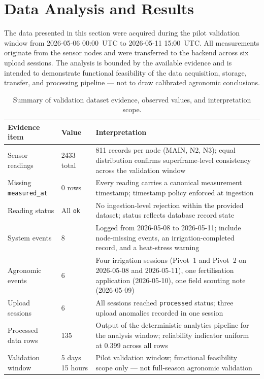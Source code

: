 \section{Data Analysis and Results}
\label{sec:results}

The data presented in this section were acquired during the pilot validation window from 2026-05-06 00:00~UTC to 2026-05-11 15:00~UTC. All measurements originate from the sensor nodes and were transferred to the backend across six upload sessions. The analysis is bounded by the available evidence and is intended to demonstrate functional feasibility of the data acquisition, storage, transfer, and processing pipeline — not to draw calibrated agronomic conclusions.

\begin{table}[H]
\centering
\caption{Summary of validation dataset evidence, observed values, and interpretation scope.}
\label{tab:validation-data-summary}
\small
\begin{tabular}{p{3.5cm} p{3.5cm} p{6.5cm}}
\hline
\textbf{Evidence item} & \textbf{Value} & \textbf{Interpretation} \\
\hline
Sensor readings & 2433 total & 811 records per node (MAIN, N2, N3); equal distribution confirms superframe-level consistency across the validation window \\
\hline
Missing \texttt{measured\_at} & 0 rows & Every reading carries a canonical measurement timestamp; timestamp policy enforced at ingestion \\
\hline
Reading status & All \texttt{ok} & No ingestion-level rejection within the provided dataset; status reflects database record state \\
\hline
System events & 8 & Logged from 2026-05-08 to 2026-05-11; include node-missing events, an irrigation-completed record, and a heat-stress warning \\
\hline
Agronomic events & 6 & Four irrigation sessions (Pivot~1 and Pivot~2 on 2026-05-08 and 2026-05-11), one fertilisation application (2026-05-10), one field scouting note (2026-05-09) \\
\hline
Upload sessions & 6 & All sessions reached \texttt{processed} status; three upload anomalies recorded in one session \\
\hline
Processed data rows & 135 & Output of the deterministic analytics pipeline for the analysis window; reliability indicator uniform at 0.399 across all rows \\
\hline
Validation window & 5 days 15 hours & Pilot validation window; functional feasibility scope only — not full-season agronomic validation \\
\hline
\end{tabular}
\end{table}

